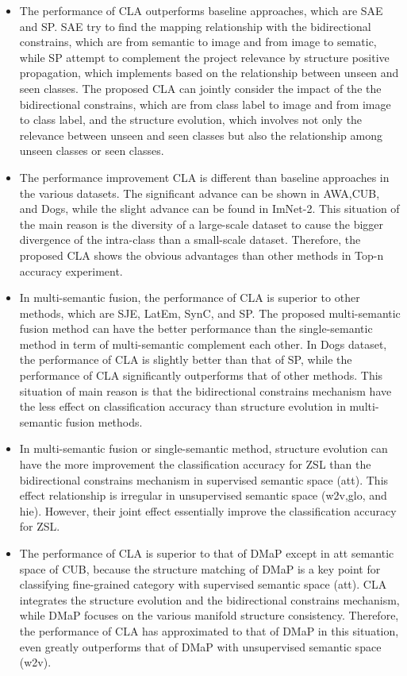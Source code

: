 \documentclass[review]{elsarticle}
\begin{document}
\begin{itemize}
\item The performance of CLA outperforms baseline approaches, which are SAE and SP. SAE try to find the mapping relationship with the bidirectional constrains, which are from semantic to image and from image to sematic, while SP attempt to complement the project relevance by structure positive propagation, which implements based on the relationship between unseen and seen classes. The proposed CLA can jointly consider the impact of the the bidirectional constrains, which are from class label to image and from image to class label, and the structure evolution, which involves not only the relevance between unseen and seen classes but also the relationship among unseen classes or seen classes.
\item The performance improvement CLA is different than baseline approaches in the various datasets. The significant advance can be shown in AWA,CUB, and Dogs, while the slight advance can be found in ImNet-2. This situation of the main reason is the diversity of a large-scale dataset to cause the bigger divergence of the intra-class than a small-scale dataset. Therefore, the proposed CLA shows the obvious advantages than other methods in Top-n accuracy experiment.
\item In multi-semantic fusion, the performance of CLA is superior to other methods, which are SJE, LatEm, SynC, and SP. The proposed multi-semantic fusion method can have the better performance than the single-semantic method in term of multi-semantic complement each other. In Dogs dataset, the performance of CLA is slightly better than that of SP, while the performance of CLA significantly outperforms that of other methods. This situation of main reason is that the bidirectional constrains mechanism have the less effect on classification accuracy than structure evolution in multi-semantic fusion methods.
\item In multi-semantic fusion or single-semantic method, structure evolution can have the more improvement the classification accuracy for ZSL than the bidirectional constrains mechanism in supervised semantic space (att). This effect relationship is irregular in unsupervised semantic space (w2v,glo, and hie). However, their joint effect essentially improve the classification accuracy for ZSL.
\item The performance of CLA is superior to that of DMaP except in att semantic space of CUB, because the structure matching of DMaP is a key point for classifying fine-grained category with supervised semantic space (att). CLA integrates the structure evolution and the bidirectional constrains mechanism, while DMaP focuses on the various manifold structure consistency. Therefore, the performance of CLA has approximated to that of DMaP in this situation, even greatly outperforms that of DMaP with unsupervised semantic space (w2v).

\end{itemize}
\end{document}
